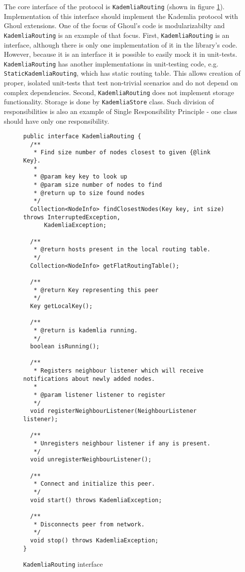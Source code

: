 The core interface of the protocol is \texttt{KademliaRouting} (shown in figure \ref{fig:routing_interface}).
Implementation of this interface should implement the Kademlia protocol with Ghoul extensions.
One of the focus of Ghoul's code is modularizabilty and \texttt{KademliaRouting} is an example of that focus.
First, \texttt{KademliaRouting} is an interface, although there is only one implementation of it in the library's code.
However, because it is an interface it is possible to easily mock it in unit-tests.
\texttt{KademliaRouting} has another implementations in unit-testing code, e.g. \texttt{StaticKademliaRouting}, which has static routing table.
This allows creation of proper, isolated unit-tests that test non-trivial scenarios and do not depend on complex dependencies.
Second, \texttt{KademliaRouting} does not implement storage functionality.
Storage is done by \texttt{KademliaStore} class.
Such division of responsibilities is also an example of Single Responsibility
Principle - one class should have only one responsibility.

\begin{figure}[tbp]
\begin{lstlisting}
public interface KademliaRouting {
  /**
   * Find size number of nodes closest to given {@link Key}.
   *
   * @param key key to look up
   * @param size number of nodes to find
   * @return up to size found nodes
   */
  Collection<NodeInfo> findClosestNodes(Key key, int size) throws InterruptedException,
      KademliaException;

  /**
   * @return hosts present in the local routing table.
   */
  Collection<NodeInfo> getFlatRoutingTable();

  /**
   * @return Key representing this peer
   */
  Key getLocalKey();

  /**
   * @return is kademlia running.
   */
  boolean isRunning();

  /**
   * Registers neighbour listener which will receive notifications about newly added nodes.
   *
   * @param listener listener to register
   */
  void registerNeighbourListener(NeighbourListener listener);

  /**
   * Unregisters neighbour listener if any is present.
   */
  void unregisterNeighbourListener();

  /**
   * Connect and initialize this peer.
   */
  void start() throws KademliaException;

  /**
   * Disconnects peer from network.
   */
  void stop() throws KademliaException;
}
\end{lstlisting}
\caption{\texttt{KademliaRouting} interface}
\label{fig:routing_interface}
\end{figure}

